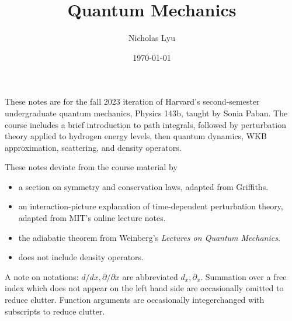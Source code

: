 \documentclass[12pt]{article}
\theoremstyle{defstyle}
\theoremstyle{remarkstyle}
\numberwithin{equation}{section}
\numberwithin{definition}{section}
\numberwithin{corollary}{section}
\numberwithin{theorem}{section}
\numberwithin{theoremr}{section}
\numberwithin{remark}{section}
\numberwithin{example}{section}
\newcommand{\pd}[1]{\partial_{#1}} %
\begin{document}
\title{Quantum Mechanics}
\author{Nicholas Lyu}
\date{\today}
\maketitle


These notes are for the fall 2023 iteration of Harvard's second-semester 
undergraduate quantum mechanics, Physics 143b, taught by Sonia Paban. 
The course includes a brief introduction to path integrals, 
followed by perturbation theory applied 
to hydrogen energy levels, then quantum dynamics, WKB approximation, 
scattering, and density operators. 

These notes deviate from the course material by 
\begin{itemize}
    \item a section on symmetry and conservation laws, adapted from Griffiths. 
    \item an interaction-picture explanation of time-dependent perturbation theory, 
        adapted from MIT's online lecture notes. 
    \item the adiabatic theorem from Weinberg's \textit{Lectures on Quantum Mechanics}. 
    \item does not include density operators. 
\end{itemize}
A note on notations: $d/dx, \partial /\partial x$ are abbreviated $d_x, \pd x$. 
Summation over a free index which does not appear on the left hand side are occasionally 
omitted to reduce clutter. Function arguments are occasionally integerchanged with subscripts 
to reduce clutter. 

\tableofcontents
\pagebreak








\end{document}
